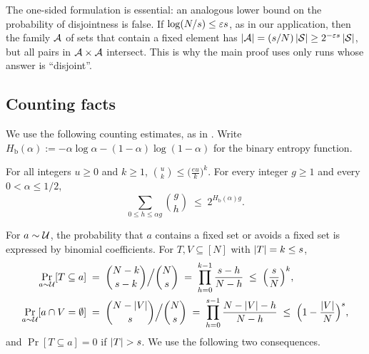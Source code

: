 The one-sided formulation is essential: an analogous lower bound on the probability of disjointness is false. If $\log(N/s) \le \varepsilon s$, as in our application, then the family $\mathcal{A}$ of sets that contain a fixed element has $\left|\mathcal{A}\right| = (s/N)\left|\mathcal{S}\right| \ge 2^{-\varepsilon s}\left|\mathcal{S}\right|$, but all pairs in $\mathcal{A} \times \mathcal{A}$ intersect. This is why the main proof uses only runs whose answer is ``disjoint''.

\subsection{Counting facts}\label{sec:bfs-tools}

We use the following counting estimates, as in \cite{babai_complexity_1986}. Write $H_{\mathrm b}(\alpha) := -\alpha\log\alpha - (1-\alpha)\log(1-\alpha)$ for the binary entropy function.

\begin{fact}\label{fact:binom}
For all integers $u \ge 0$ and $k \ge 1$, $\binom uk \le \big(\frac{eu}{k}\big)^k$. For every integer $g \ge 1$ and every $0 < \alpha \le 1/2$,
\[ \sum_{0 \le h \le \alpha g}\binom gh \;\le\; 2^{H_{\mathrm b}(\alpha)g}. \]
\end{fact}

\noindent For $a \sim \mathcal{U}$, the probability that $a$ contains a fixed set or avoids a fixed set is expressed by binomial coefficients. For $T, V \subseteq [N]$ with $\left|T\right| = k \le s$,
\begin{align*}
\Pr_{a \sim \mathcal{U}}[T \subseteq a] \;&=\; \binom{N-k}{s-k}\Big/\binom Ns \;=\; \prod_{h=0}^{k-1}\frac{s-h}{N-h} \;\le\; \Big(\frac sN\Big)^k, \\
\Pr_{a \sim \mathcal{U}}[a \cap V = \emptyset] \;&=\; \binom{N - \left|V\right|}{s}\Big/\binom Ns \;=\; \prod_{h=0}^{s-1}\frac{N - \left|V\right| - h}{N-h} \;\le\; \Big(1 - \frac{\left|V\right|}{N}\Big)^s,
\end{align*}
and $\Pr[T \subseteq a] = 0$ if $\left|T\right| > s$. We use the following two consequences.

